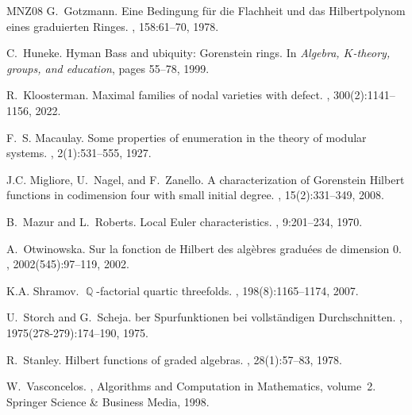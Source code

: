 \documentclass[a4paper,11pt,english,german]{amsart}
\DeclareMathOperator{\Q}{\mathbb{Q}}
\theoremstyle{definition}
\begin{document}
\begin{thebibliography}{MNZ08}
G.~Gotzmann.
\newblock Eine {B}edingung f{\"u}r die {F}lachheit und das {H}ilbertpolynom eines graduierten {R}inges.
, 158:61--70, 1978.

C.~Huneke.
\newblock Hyman {B}ass and ubiquity: {G}orenstein rings.
\newblock In {\em Algebra, $K$-theory, groups, and education}, pages 55--78, 1999.

R.~Kloosterman.
\newblock Maximal families of nodal varieties with defect.
, 300(2):1141--1156, 2022.

F.~S. Macaulay.
\newblock Some properties of enumeration in the theory of modular systems.
, 2(1):531--555, 1927.

J.C. Migliore, U.~Nagel, and F.~Zanello.
\newblock A characterization of {G}orenstein {H}ilbert functions in codimension four with small initial degree.
, 15(2):331--349, 2008.

B.~Mazur and L.~Roberts.
\newblock Local {E}uler characteristics.
, 9:201--234, 1970.

A.~Otwinowska.
\newblock Sur la fonction de {H}ilbert des algèbres gradu{\'e}es de dimension 0.
,
2002(545):97--119, 2002.

K.A. Shramov.
\newblock $\Q$-factorial quartic threefolds.
, 198(8):1165--1174, 2007.

U.~Storch and G.~Scheja.
ber {S}purfunktionen bei vollst{\"a}ndigen {D}urchschnitten.
, 1975(278-279):174--190, 1975.

R.~Stanley.
\newblock Hilbert functions of graded algebras.
, 28(1):57--83, 1978.

W.~Vasconcelos.
, Algorithms and Computation in Mathematics, volume~2.
\newblock Springer Science \& Business Media, 1998.

\end{thebibliography}

	
\end{document}
